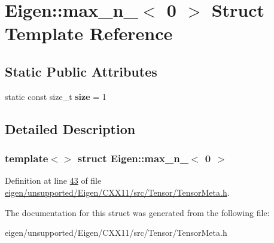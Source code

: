\hypertarget{struct_eigen_1_1max__n__1_3_010_01_4}{}\section{Eigen\+:\+:max\+\_\+n\+\_$<$ 0 $>$ Struct Template Reference}
\label{struct_eigen_1_1max__n__1_3_010_01_4}
\subsection*{Static Public Attributes}
\begin{DoxyCompactItemize}
\item 
\mbox{\label{struct_eigen_1_1max__n__1_3_010_01_4_a6df5a8e7491436f7984a6c400b8ab3fa}} 
static const size\+\_\+t {\bfseries size} = 1
\end{DoxyCompactItemize}


\subsection{Detailed Description}
\subsubsection*{template$<$$>$\newline
struct Eigen\+::max\+\_\+n\+\_$<$ 0 $>$}



Definition at line \hyperlink{eigen_2unsupported_2_eigen_2_c_x_x11_2src_2_tensor_2_tensor_meta_8h_source_l00043}{43} of file \hyperlink{eigen_2unsupported_2_eigen_2_c_x_x11_2src_2_tensor_2_tensor_meta_8h_source}{eigen/unsupported/\+Eigen/\+C\+X\+X11/src/\+Tensor/\+Tensor\+Meta.\+h}.



The documentation for this struct was generated from the following file\+:\begin{DoxyCompactItemize}
\item 
eigen/unsupported/\+Eigen/\+C\+X\+X11/src/\+Tensor/\+Tensor\+Meta.\+h\end{DoxyCompactItemize}

